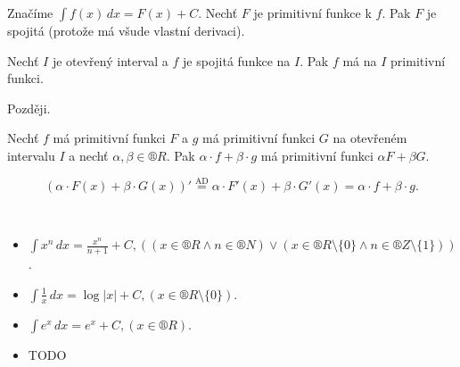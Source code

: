 \documentclass[12pt]{article}                   %
\begin{document}
        \begin{poznamka}
            Značíme $\int f(x)\,dx = F(x) + C$. Nechť $F$ je primitivní funkce k $f$. Pak $F$ je spojitá (protože má všude vlastní derivaci).
        \end{poznamka}

        \begin{veta}
            Nechť $I$ je otevřený interval a $f$ je spojitá funkce na $I$. Pak $f$ má na $I$ primitivní funkci.

            \begin{dukazin}
                Později.
            \end{dukazin}
        \end{veta}

        \begin{veta}
            Nechť $f$ má primitivní funkci $F$ a $g$ má primitivní funkci $G$ na otevřeném intervalu $I$ a nechť $\alpha, \beta \in ®R$. Pak $\alpha·f + \beta·g$ má primitivní funkci $\alpha F + \beta G$.

            \begin{dukazin}
                $$ (\alpha·F(x) + \beta·G(x))' \overset{\text{AD}}{=} \alpha·F'(x) + \beta·G'(x) = \alpha·f + \beta·g. $$
            \end{dukazin}
        \end{veta}

        \begin{poznamka}
            \ 
            \begin{itemize}
                \item $ \int x^n\,dx = \frac{x^n}{n+1} + C, ((x \in ®R \land n \in ®N) \lor (x \in ®R \setminus\{0\} \land n \in ®Z \setminus \{1\}))$.
                \item $\int \frac{1}{x}\, dx = \log|x| + C, (x \in ®R \setminus \{0\})$.
                \item $\int e^x\, dx = e^x + C, (x \in ®R)$.
                \item TODO
            \end{itemize}
        \end{poznamka}
\end{document}
